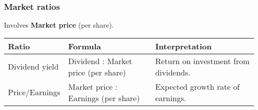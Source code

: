 \subsubsection{Market ratios}

Involves \textbf{Market price} (per share).

\begin{table}[H]
    \centering
    \begin{tabular}{p{}p{}p{}}
        \hline
        \textbf{Ratio} & \textbf{Formula}                    & \textbf{Interpretation}              \\
        \hline
        Dividend yield & Dividend : Market price (per share) & Return on investment from dividends. \\
        \hline
        Price/Earnings & Market price : Earnings (per share) & Expected growth rate of earnings.    \\
        \hline
    \end{tabular}
\end{table}